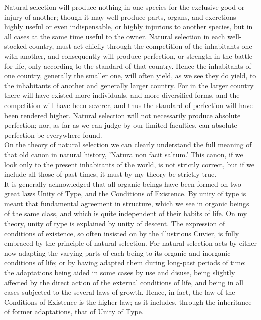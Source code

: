 \indent Natural selection will produce nothing in one species for the exclusive good or injury of another; though it may well produce parts, organs, and excretions highly useful or even indispensable, or highly injurious to another species, but in all cases at the same time useful to the owner. Natural selection in each well-stocked country, must act chiefly through the competition of the inhabitants one with another, and consequently will produce perfection, or strength in the battle for life, only according to the standard of that country. Hence the inhabitants of one country, generally the smaller one, will often yield, as we see they do yield, to the inhabitants of another and generally larger country. For in the larger country there will have existed more individuals, and more diversified forms, and the competition will have been severer, and thus the standard of perfection will have been rendered higher. Natural selection will not necessarily produce absolute perfection; nor, as far as we can judge by our limited faculties, can absolute perfection be everywhere found.\\
\indent On the theory of natural selection we can clearly understand the full meaning of that old canon in natural history, 'Natura non facit saltum.' This canon, if we look only to the present inhabitants of the world, is not strictly correct, but if we include all those of past times, it must by my theory be strictly true.\\
\indent It is generally acknowledged that all organic beings have been formed on two great laws Unity of Type, and the Conditions of Existence. By unity of type is meant that fundamental agreement in structure, which we see in organic beings of the same class, and which is quite independent of their habits of life. On my theory, unity of type is explained by unity of descent. The expression of conditions of existence, so often insisted on by the illustrious Cuvier, is fully embraced by the principle of natural selection. For natural selection acts by either now adapting the varying parts of each being to its organic and inorganic conditions of life; or by having adapted them during long-past periods of time: the adaptations being aided in some cases by use and disuse, being slightly affected by the direct action of the external conditions of life, and being in all cases subjected to the several laws of growth. Hence, in fact, the law of the Conditions of Existence is the higher law; as it includes, through the inheritance of former adaptations, that of Unity of Type.\\